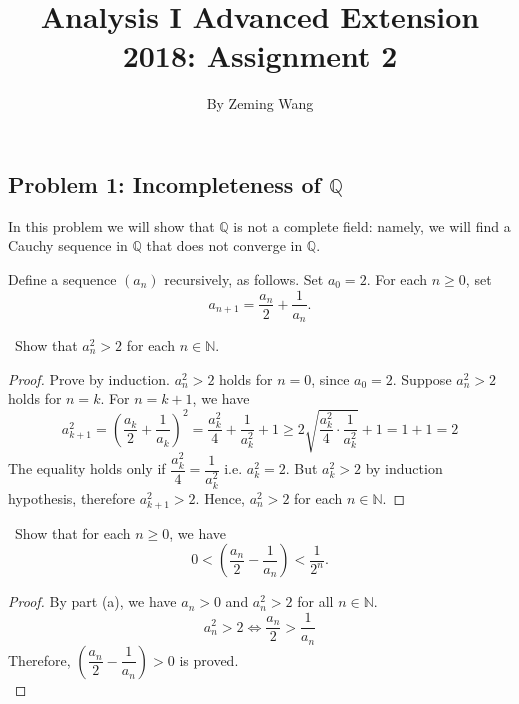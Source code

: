 \documentclass[12pt,a4paper]{amsart}
\title{Analysis I Advanced Extension 2018: Assignment 2}
\author{By Zeming Wang}
\newcommand{\bbN}{\mathbb{N}}
\newcommand{\bbQ}{\mathbb{Q}}
\newcommand{\turnin}{\faPencilSquareO}
\begin{document}
\maketitle

\subsection*{Problem 1: Incompleteness of $\bbQ$}
In this problem we will show that $\mathbb{Q}$ is not a complete field: namely, we will find a Cauchy sequence in $\mathbb{Q}$ that does not converge in $\mathbb{Q}$.

Define a sequence $(a_n)$ recursively, as follows.
Set $a_0 = 2$.
For each $n \geq 0$, set
\[
  a_{n+1} = \frac{a_n}{2} + \frac{1}{a_n}.
\]
\begin{compactenum}[(a)]
  \setlength{\itemsep}{0.5em}
\item \turnin\ Show that $a_n^2 > 2$ for each $n\in \bbN$.

\begin{proof}
Prove by induction. $a_n^2 > 2$ holds for $n=0$, since $a_0=2$.
Suppose $a_n^2 > 2$ holds for $n=k$. For $n=k+1$, we have
$$ a_{k+1}^2 = \left(\frac{a_k}{2} + \frac{1}{a_k}\right)^2
           = \frac{a_k^2}{4} + \frac{1}{a_k^2} + 1
           \ge 2\sqrt{\frac{a_k^2}{4}\cdot \frac{1}{a_k^2}} + 1
           = 1+1 = 2
$$
The equality holds only if $\dfrac{a_k^2}{4} = \dfrac{1}{a_k^2}$
i.e. $a_k^2 = 2$. But $a_k^2 > 2$  by induction hypothesis,
therefore $a_{k+1}^2 > 2$.
Hence, $a_n^2 > 2$ for each $n\in \bbN$.
\end{proof}


\item \turnin\ Show that for each $n \geq 0$, we have
  \[
    0 < \left(\frac{a_n}{2} - \frac{1}{a_n}\right) < \frac{1}{2^n}.
  \]

\begin{proof}
By part (a), we have $a_n > 0$ and $a_n^2 > 2$ for all $n\in \bbN$.
$$ a_n^2 > 2 \Leftrightarrow \frac{a_n}{2} > \frac{1}{a_n} $$
Therefore, $\left(\dfrac{a_n}{2} - \dfrac{1}{a_n}\right)>0$ is proved.\\


\end{proof}
\end{compactenum}
\end{document}
